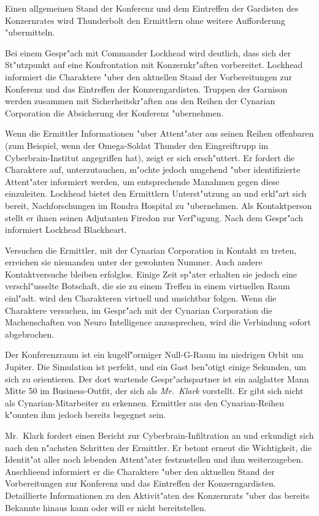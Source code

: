 Einen allgemeinen Stand der Konferenz und dem Eintreffen der Gardisten des Konzernrates wird Thunderbolt den Ermittlern ohne weitere Aufforderung "ubermitteln.

Bei einem Gespr"ach mit Commander Lockhead wird deutlich, dass sich der St"utzpunkt auf eine Konfrontation mit Konzernkr"aften vorbereitet. Lockhead informiert die Charaktere "uber den aktuellen Stand der Vorbereitungen zur Konferenz und das Eintreffen der Konzerngardisten. Truppen der Garnison werden zusammen mit Sicherheitskr"aften aus den Reihen der Cynarian Corporation die Absicherung der Konferenz "ubernehmen. 

Wenn die Ermittler Informationen "uber Attent"ater aus seinen Reihen offenbaren (zum Beispiel, wenn der Omega-Soldat Thunder den Eingreiftrupp im Cyberbrain-Institut angegriffen hat), zeigt er sich ersch"uttert. Er fordert die Charaktere auf, unterzutauchen, m"ochte jedoch umgehend "uber identifizierte Attent"ater informiert werden, um entsprechende Ma\3nahmen gegen diese einzuleiten. Lockhead bietet den Ermittlern Unterst"utzung an und erkl"art sich bereit, Nachforschungen im Rondra Hospital zu "ubernehmen. Als Kontaktperson stellt er ihnen seinen Adjutanten Firedon zur Verf"ugung. Nach dem Gespr"ach informiert Lockhead Blackheart.

Versuchen die Ermittler, mit der Cynarian Corporation in Kontakt zu treten, erreichen sie niemanden unter der gewohnten Nummer. Auch andere Kontaktversuche bleiben erfolglos. Einige Zeit sp"ater erhalten sie jedoch eine verschl"usselte Botschaft, die sie zu einem Treffen in einem virtuellen Raum einl"adt. \xl{} wird den Charakteren virtuell und unsichtbar folgen. Wenn die Charaktere versuchen, im Gespr"ach mit der Cynarian Corporation die Machenschaften von Neuro Intelligence anzusprechen, wird die Verbindung sofort abgebrochen.

Der Konferenzraum ist ein kugelf"ormiger Null-G-Raum im niedrigen Orbit um Jupiter. Die Simulation ist perfekt, und ein Gast ben"otigt einige Sekunden, um sich zu orientieren. Der dort wartende Gespr"achspartner ist ein aalglatter Mann Mitte 50 im Business-Outfit, der sich als \emph{Mr.~Klark} vorstellt. Er gibt sich nicht als Cynarian-Mitarbeiter zu erkennen. Ermittler aus den Cynarian-Reihen k"onnten ihm jedoch bereits begegnet sein.

Mr.~Klark fordert einen Bericht zur Cyberbrain-Infiltration an und erkundigt sich nach den n"achsten Schritten der Ermittler. Er betont erneut die Wichtigkeit, die Identit"at aller noch lebenden Attent"ater festzustellen und ihm weiterzugeben. Anschlie\3end informiert er die Charaktere "uber den aktuellen Stand der Vorbereitungen zur Konferenz und das Eintreffen der Konzerngardisten. Detaillierte Informationen zu den Aktivit"aten des Konzernrats "uber das bereits Bekannte hinaus kann oder will er nicht bereitstellen.

